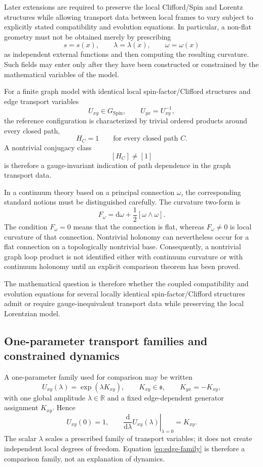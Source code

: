 \documentclass[11pt,a4paper]{article}
\theoremstyle{remark}
\newcommand{\R}{\mathbb{R}}
\newcommand{\SpinG}{G_{\mathrm{Spin}}}
\newcommand{\dd}{\mathrm d}
\begin{document}
Later extensions are required to preserve the local Clifford/Spin and Lorentz structures while allowing transport data between local frames to vary subject to explicitly stated compatibility and evolution equations.  In particular, a non-flat geometry must not be obtained merely by prescribing
\[
  s=s(x),
  \qquad
  \lambda=\lambda(x),
  \qquad
  \omega=\omega(x)
\]
as independent external functions and then computing the resulting curvature.  Such fields may enter only after they have been constructed or constrained by the mathematical variables of the model.

For a finite graph model with identical local spin-factor/Clifford structures and edge transport variables
\[
  U_{xy}\in\SpinG,
  \qquad
  U_{yx}=U_{xy}^{-1},
\]
the reference configuration is characterized by trivial ordered products around every closed path,
\[
  H_C=1
  \qquad
  \text{for every closed path }C.
\]
A nontrivial conjugacy class
\[
  [H_C]\neq[1]
\]
is therefore a gauge-invariant indication of path dependence in the graph transport data.

In a continuum theory based on a principal connection \(\omega\), the corresponding standard notions must be distinguished carefully.  The curvature two-form is
\[
  F_\omega
  =\dd\omega+\frac12[\omega\wedge\omega].
\]
The condition \(F_\omega=0\) means that the connection is flat, whereas \(F_\omega\neq0\) is local curvature of that connection.  Nontrivial holonomy can nevertheless occur for a flat connection on a topologically nontrivial base.  Consequently, a nontrivial graph loop product is not identified either with continuum curvature or with continuum holonomy until an explicit comparison theorem has been proved.

The mathematical question is therefore whether the coupled compatibility and evolution equations for several locally identical spin-factor/Clifford structures admit or require gauge-inequivalent transport data while preserving the local Lorentzian model.

\subsection{One-parameter transport families and constrained dynamics}

A one-parameter family used for comparison may be written
\begin{equation}
  U_{xy}(\lambda)=\exp(\lambda K_{xy}),
  \qquad
  K_{xy}\in\mathfrak s,
  \qquad
  K_{yx}=-K_{xy},
\tag{3.5}\label{eq:edge-family}
\end{equation}
with one global amplitude \(\lambda\in\R\) and a fixed edge-dependent generator assignment \(K_{xy}\).  Hence
\[
  U_{xy}(0)=1,
  \qquad
  \left.\frac{\dd}{\dd\lambda}U_{xy}(\lambda)\right|_{\lambda=0}=K_{xy}.
\]
The scalar \(\lambda\) scales a prescribed family of transport variables; it does not create independent local degrees of freedom.  Equation \eqref{eq:edge-family} is therefore a comparison family, not an explanation of dynamics.
\end{document}

